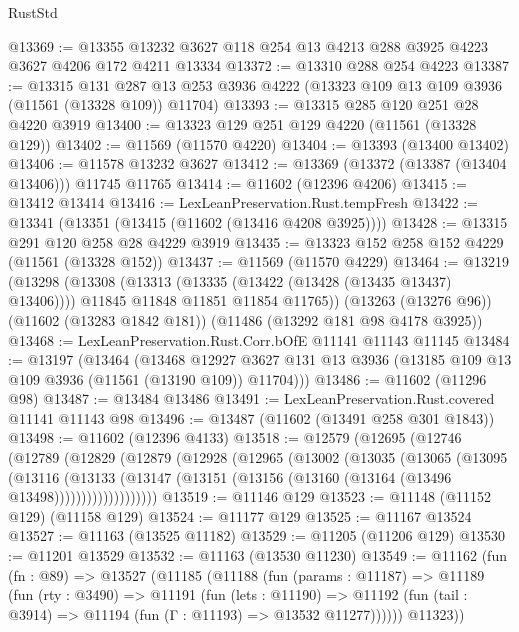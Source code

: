 \begin{lexlean}{RustStd}
\begin{coremodule}
@13369 := @13355 @13232 @3627 @118 @254 @13 @4213 @288 @3925 @4223 @3627 @4206 @172 @4211 @13334
@13372 := @13310 @288 @254 @4223
@13387 := @13315
    @131
    @287
    @13
    @253
    @3936
    @4222
    (@13323 @109 @13 @109 @3936 (@11561 (@13328 @109)) @11704)
@13393 := @13315 @285 @120 @251 @28 @4220 @3919
@13400 := @13323 @129 @251 @129 @4220 (@11561 (@13328 @129))
@13402 := @11569 (@11570 @4220)
@13404 := @13393 (@13400 @13402)
@13406 := @11578 @13232 @3627
@13412 := @13369 (@13372 (@13387 (@13404 @13406))) @11745 @11765
@13414 := @11602 (@12396 @4206)
@13415 := @13412 @13414
@13416 := LexLeanPreservation.Rust.tempFresh
@13422 := @13341 (@13351 (@13415 (@11602 (@13416 @4208 @3925))))
@13428 := @13315 @291 @120 @258 @28 @4229 @3919
@13435 := @13323 @152 @258 @152 @4229 (@11561 (@13328 @152))
@13437 := @11569 (@11570 @4229)
@13464 := @13219
    (@13298
      (@13308
        (@13313 (@13335 (@13422 (@13428 (@13435 @13437) @13406))))
        @11845
        @11848
        @11851
        @11854
        @11765))
    (@13263 (@13276 @96))
    (@11602 (@13283 @1842 @181))
    (@11486 (@13292 @181 @98 @4178 @3925))
@13468 := LexLeanPreservation.Rust.Corr.bOfE @11141 @11143 @11145
@13484 := @13197
    (@13464
      (@13468
        @12927
        @3627
        @131
        @13
        @3936
        (@13185 @109 @13 @109 @3936 (@11561 (@13190 @109)) @11704)))
@13486 := @11602 (@11296 @98)
@13487 := @13484 @13486
@13491 := LexLeanPreservation.Rust.covered @11141 @11143 @98
@13496 := @13487 (@11602 (@13491 @258 @301 @1843))
@13498 := @11602 (@12396 @4133)
@13518 := @12579
    (@12695
      (@12746
        (@12789
          (@12829
            (@12879
              (@12928
                (@12965
                  (@13002
                    (@13035
                      (@13065
                        (@13095
                          (@13116
                            (@13133
                              (@13147
                                (@13151 (@13156 (@13160 (@13164 (@13496 @13498)))))))))))))))))))
@13519 := @11146 @129
@13523 := @11148 (@11152 @129) (@11158 @129)
@13524 := @11177 @129
@13525 := @11167 @13524
@13527 := @11163 (@13525 @11182)
@13529 := @11205 (@11206 @129)
@13530 := @11201 @13529
@13532 := @11163 (@13530 @11230)
@13549 := @11162
    (fun (fn : @89) =>
    @13527
      (@11185
        (@11188
          (fun (params : @11187) =>
          @11189
            (fun (rty : @3490) =>
            @11191
              (fun (lets : @11190) =>
              @11192 (fun (tail : @3914) => @11194 (fun (Γ : @11193) => @13532 @11277))))))
        @11323))

\end{coremodule}
\end{lexlean}
